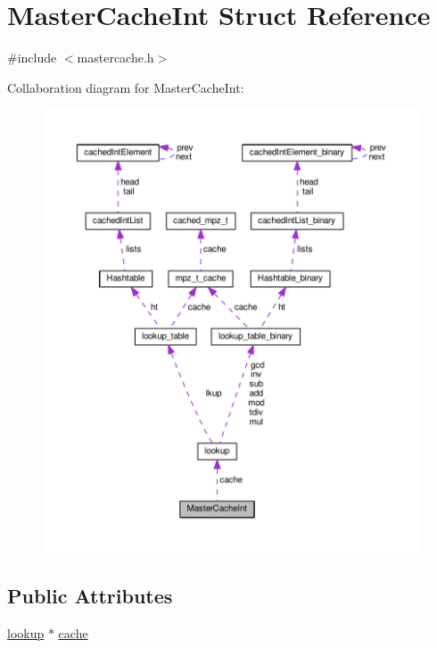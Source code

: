 \hypertarget{structMasterCacheInt}{}\section{Master\+Cache\+Int Struct Reference}
\label{structMasterCacheInt}


{\ttfamily \#include $<$mastercache.\+h$>$}



Collaboration diagram for Master\+Cache\+Int\+:\nopagebreak
\begin{figure}[H]
\begin{center}
\leavevmode
\includegraphics[width=350pt]{structMasterCacheInt__coll__graph}
\end{center}
\end{figure}
\subsection*{Public Attributes}
\begin{DoxyCompactItemize}
\item 
\hyperlink{structlookup}{lookup} $\ast$ \hyperlink{structMasterCacheInt_a4e80ed8be2db43aa586a75118a62606a}{cache}
\end{DoxyCompactItemize}



